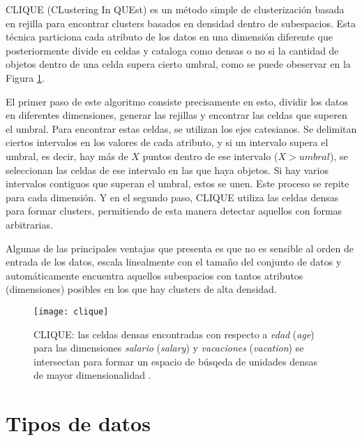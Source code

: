 \documentclass[10pt, a4paper]{article}
\begin{document}
  CLIQUE (CLustering In QUEst) es un método simple de clusterización basada en rejilla para encontrar clusters basados en densidad dentro de subespacios. Esta técnica particiona cada atributo de los datos en una dimensión diferente que posteriormente divide en celdas y cataloga como densas o no si la cantidad de objetos dentro de una celda supera cierto umbral, como se puede obeservar en la Figura \ref{fig:clique}.

El primer paso de este algoritmo consiste precisamente en esto, dividir los datos en diferentes dimensiones, generar las rejillas y encontrar las celdas que superen el umbral. Para encontrar estas celdas, se utilizan los ejes catesianos. Se delimitan ciertos intervalos en los valores de cada atributo, y si un intervalo supera el umbral, es decir, hay más de $X$ puntos dentro de ese intervalo ($X > umbral$), se seleccionan las celdas de ese intervalo en las que haya objetos. Si hay varios intervalos contiguos que superan el umbral, estos se unen. Este proceso se repite para cada dimensión. Y en el segundo paso, CLIQUE utiliza las celdas densas para formar clusters, permitiendo de esta manera detectar aquellos con formas arbitrarias.

Algunas de las principales ventajas que presenta es que no es sensible al orden de entrada de los datos, escala linealmente con el tamaño del conjunto de datos y automáticamente encuentra aquellos subespacios con tantos atributos (dimensiones) posibles en los que hay clusters de alta densidad.


\begin{figure}[ht]
\centering
\texttt{[image: clique]}
\caption{CLIQUE: las celdas densas encontradas con respecto a \textit{edad} (\textit{age}) para las dimensiones \textit{salario} (\textit{salary}) y \textit{vacaciones} (\textit{vacation}) se intersectan para formar un espacio de búsqeda de unidades densas de mayor dimensionalidad \cite{LIBRO}.}
\label{fig:clique}
\end{figure}



\section{Tipos de datos} \label{sec:tipos de datos}
\end{document}
